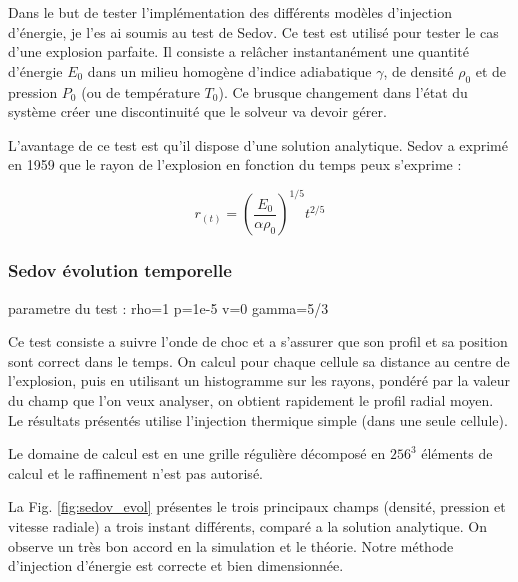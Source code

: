 
Dans le but de tester l'implémentation des différents modèles d'injection d'énergie, je l'es ai soumis au test de Sedov.
Ce test est utilisé pour tester le cas d'une explosion parfaite.
Il consiste a relâcher instantanément une quantité d'énergie $E_0$ dans un milieu homogène d'indice adiabatique $\gamma$, de densité $\rho_0$ et de pression $P_0$ (ou de température $T_0$).
Ce brusque changement dans l'état du système créer une discontinuité que le solveur va devoir gérer.

L'avantage de ce test est qu'il dispose d'une solution analytique.
Sedov a exprimé  en 1959 que le rayon de l'explosion en fonction du temps peux s'exprime : %

\begin{equation}
r_{(t)}=\left( \frac{E_0}{\alpha \rho_0 }\right)^{1/5} t^{2/5}
\end{equation}


\subsubsection{Sedov évolution temporelle }


parametre du test :
rho=1
p=1e-5
v=0
gamma=5/3


Ce test consiste a suivre l'onde de choc et a s'assurer que son profil et sa position sont correct dans le temps.
On calcul pour chaque cellule sa distance au centre de l'explosion, puis en utilisant un histogramme sur les rayons, pondéré par la valeur du champ que l'on veux analyser, on obtient rapidement le profil radial moyen.
Le résultats présentés utilise l'injection thermique simple (dans une seule cellule).

Le domaine de calcul est en une grille régulière décomposé en $256^3$ éléments  de calcul et le raffinement n'est pas autorisé.

La Fig. \ref{fig:sedov_evol} présentes le trois principaux champs (densité, pression et vitesse radiale) a trois instant différents, comparé a la solution analytique.
On observe un très bon accord en la simulation et le théorie.
Notre méthode d'injection d'énergie est correcte et bien dimensionnée.
%

